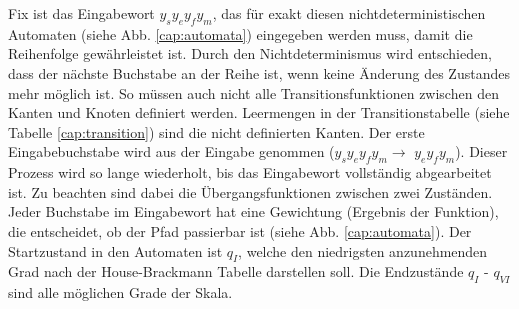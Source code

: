 Fix ist das Eingabewort \flqq $y_sy_ey_fy_m$\frqq, das für exakt diesen nichtdeterministischen Automaten (siehe Abb. \ref{cap:automata}) eingegeben werden muss, damit die Reihenfolge gewährleistet ist. Durch den Nichtdeterminismus wird entschieden, dass der nächste Buchstabe an der Reihe ist, wenn keine Änderung des Zustandes mehr möglich ist. So müssen auch nicht alle Transitionsfunktionen zwischen den Kanten und Knoten definiert werden. Leermengen in der Transitionstabelle (siehe Tabelle \ref{cap:transition}) sind die nicht definierten Kanten. Der erste Eingabebuchstabe wird aus der Eingabe genommen (\flqq $y_sy_ey_fy_m$\frqq $\rightarrow$ \flqq $y_ey_fy_m$\frqq). Dieser Prozess wird so lange wiederholt, bis das Eingabewort vollständig abgearbeitet ist. Zu beachten sind dabei die Übergangsfunktionen zwischen zwei Zuständen. Jeder Buchstabe im Eingabewort hat eine Gewichtung (Ergebnis der Funktion), die entscheidet, ob der Pfad passierbar ist (siehe Abb. \ref{cap:automata}). Der Startzustand in den Automaten ist $q_I$, welche den niedrigsten anzunehmenden Grad nach der House-Brackmann Tabelle darstellen soll. Die Endzustände $q_I$ - $q_{VI}$  sind alle möglichen Grade der Skala.

\begin{table}[t]\vspace{1ex}\centering
  \caption[Übergangsfunktion $\delta$ des Automaten für die Bestimmung des Grades]{Übergangsfunktion $\delta$ des Automaten für die Bestimmung des Grades.}\label{cap:transition}
\vspace{1ex}\end{table}\label{table:transition}

